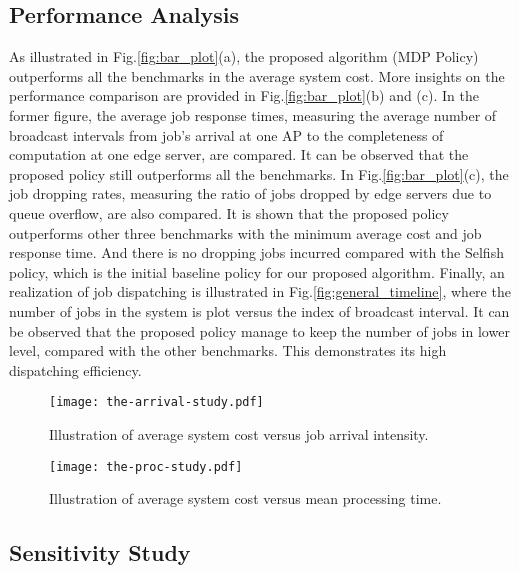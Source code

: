 \subsection{Performance Analysis}
\label{subsec:basic}
As illustrated in Fig.\ref{fig:bar_plot}(a), the proposed algorithm (MDP Policy) outperforms all the benchmarks in the average system cost.
More insights on the performance comparison are provided in Fig.\ref{fig:bar_plot}(b) and (c).
In the former figure, the average job response times, measuring the average number of broadcast intervals from job's arrival at one AP to the completeness of computation at one edge server, are compared.
It can be observed that the proposed policy still outperforms all the benchmarks.
In Fig.\ref{fig:bar_plot}(c), the job dropping rates, measuring the ratio of jobs dropped by edge servers due to queue overflow, are also compared.
It is shown that the proposed policy outperforms other three benchmarks with the minimum average cost and job response time.
And there is no dropping jobs incurred compared with the Selfish policy, which is the initial baseline policy for our proposed algorithm.
Finally, an realization of job dispatching is illustrated in Fig.\ref{fig:general_timeline}, where the number of jobs in the system is plot versus the index of broadcast interval.
It can be observed that the proposed policy manage to keep the number of jobs in lower level, compared with the other benchmarks.
This demonstrates its high dispatching efficiency.

\begin{figure}[ht!]
    \centering
    \begin{minipage}[b]{0.23\textwidth}
        \texttt{[image: the-arrival-study.pdf]}
        \caption{Illustration of average system cost versus job arrival intensity.}
        \label{fig:ss_scale}
    \end{minipage}
    \begin{minipage}[b]{0.23\textwidth}
        \texttt{[image: the-proc-study.pdf]}
        \caption{Illustration of average system cost versus mean processing time.}
        \label{fig:ss_dist}
    \end{minipage}
\end{figure}

\subsection{Sensitivity Study}
\label{subsec:advance}

